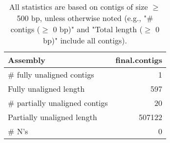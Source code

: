 \documentclass[12pt,a4paper]{article}
\begin{document}
\begin{table}[ht]
\begin{center}
\caption{All statistics are based on contigs of size $\geq$ 500 bp, unless otherwise noted (e.g., "\# contigs ($\geq$ 0 bp)" and "Total length ($\geq$ 0 bp)" include all contigs).}
\begin{tabular}{|l*{1}{|r}|}
\hline
Assembly & final.contigs \\ \hline
\# fully unaligned contigs & 1 \\ \hline
Fully unaligned length & 597 \\ \hline
\# partially unaligned contigs & 20 \\ \hline
Partially unaligned length & 507122 \\ \hline
\# N's & 0 \\ \hline
\end{tabular}
\end{center}
\end{table}
\end{document}
